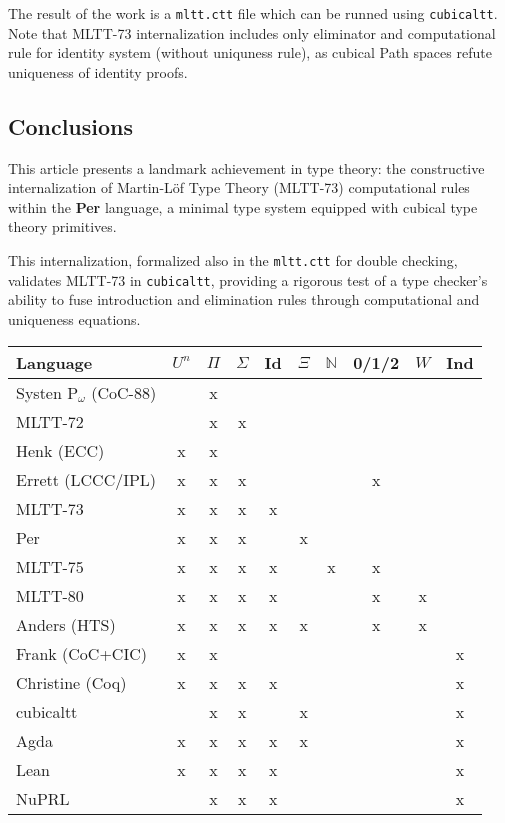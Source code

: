\documentclass{article}
\theoremstyle{definition}
\begin{document}
The result of the work is a \texttt{mltt.ctt} file which can be runned using \texttt{cubicaltt}.
Note that MLTT-73 internalization includes only eliminator and computational rule for identity
system (without uniquness rule), as cubical Path spaces refute uniqueness of identity proofs.

\subsection*{Conclusions}

This article presents a landmark achievement in type theory:
the constructive internalization of Martin-Löf Type Theory (MLTT-73) computational rules
within the \textbf{Per} language, a minimal type system equipped with
cubical type theory primitives.

This internalization, formalized also in the \texttt{mltt.ctt} for double checking,
validates MLTT-73 in \texttt{cubicaltt}, providing a rigorous test
of a type checker's ability to fuse introduction and elimination
rules through computational and uniqueness equations.

\begin{table}[!ht]
  \begin{tabular}{lccccccccc}
    \hline
       Language    & $U^n$ & $\Pi$ & $\Sigma$ & Id & $\Xi$ & $\mathbb{N}$ & 0/1/2 & $W$ & Ind  \\
    \hline
Systen P$_\omega$ (CoC-88)  &   & x &   &   &   &   &   &   &   \\
       MLTT-72              &   & x & x &   &   &   &   &   &   \\
       Henk (ECC)           & x & x &   &   &   &   &   &   &   \\
       Errett (LCCC/IPL)    & x & x & x &   &   &   & x &   &   \\
       MLTT-73              & x & x & x & x &   &   &   &   &   \\
       Per                  & x & x & x &   & x &   &   &   &   \\
       MLTT-75              & x & x & x & x &   & x & x &   &   \\
       MLTT-80              & x & x & x & x &   & & x   & x &   \\
       Anders (HTS)         & x & x & x & x & x &   & x & x &   \\
       Frank (CoC+CIC)      & x & x &   &   &   &   &   &   & x \\
       Christine (Coq)      & x & x & x & x &   &   &   &   & x \\
    \hline
       cubicaltt            &   & x & x &   & x &   &   &   & x \\
       Agda                 & x & x & x & x & x &   &   &   & x \\
       Lean                 & x & x & x & x &   &   &   &   & x \\
       NuPRL                &   & x & x & x &   &   &   &   & x \\
    \hline
  \end{tabular}
\end{table}
\end{document}
